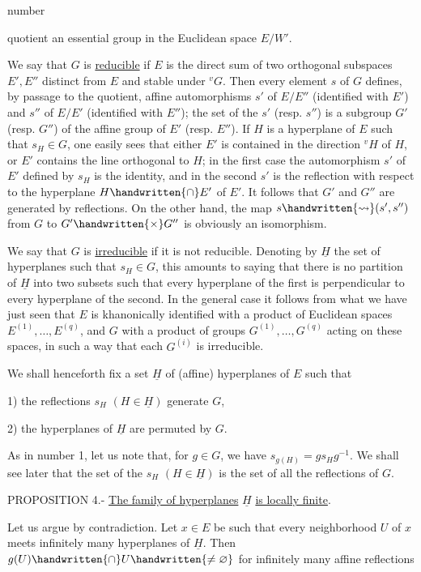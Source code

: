 \begin{flushright}number \end{flushright}
quotient an essential group in the Euclidean space $E/W'$.

We say that $G$ is \uline{reducible} if $E$ is the direct sum of two orthogonal subspaces $E',E''$ distinct from $E$ and stable under ${}^vG$. Then every element $s$ of $G$ defines, by passage to the quotient, affine automorphisms $s'$ of $E/E''$ (identified with $E'$) and $s''$ of $E/E'$ (identified with $E''$); the set of the $s'$ (resp. $s''$) is a subgroup $G'$ (resp. $G''$) of the affine group of $E'$ (resp. $E''$). If $H$ is a hyperplane of $E$ such that $s_H\in G$, one easily sees that either $E'$ is contained in the direction ${}^vH$ of $H$, or $E'$ contains the line orthogonal to $H$; in the first case the automorphism $s'$ of $E'$ defined by $s_H$ is the identity, and in the second $s'$ is the reflection with respect to the hyperplane $H\handwritten{\cap}E'$ of $E'$. It follows that $G'$ and $G''$ are generated by reflections. On the other hand, the map $s\handwritten{\rightsquigarrow}(s',s'')$ from $G$ to $G'\handwritten{\times}G''$ is obviously an isomorphism.

We say that $G$ is \uline{irreducible} if it is not reducible. Denoting by $\underline{H}$ the set of hyperplanes such that $s_H\in G$, this amounts to saying that there is no partition of $\underline{H}$ into two subsets such that every hyperplane of the first is perpendicular to every hyperplane of the second. In the general case it follows from what we have just seen that $E$ is khanonically identified with a product of Euclidean spaces $E^{(1)},\ldots,E^{(q)}$, and $G$ with a product of groups $G^{(1)},\ldots,G^{(q)}$ acting on these spaces, in such a way that each $G^{(i)}$ is irreducible.

We shall henceforth fix a set $\underline{H}$ of (affine) hyperplanes of $E$ such that

1) the reflections $s_H$ $(H\in\underline{H})$ generate $G$,

2) the hyperplanes of $\underline{H}$ are permuted by $G$.

As in number 1, let us note that, for $g\in G$, we have $s_{g(H)}=gs_Hg^{-1}$. We shall see later that the set of the $s_H$ $(H\in\underline{H})$ is the set of all the reflections of $G$.

PROPOSITION 4.- \uline{The family of hyperplanes} $\underline{H}$ \uline{is locally finite}.

Let us argue by contradiction. Let $x\in E$ be such that every neighborhood $U$ of $x$ meets infinitely many hyperplanes of $\underline{H}$. Then $g(U)\handwritten{\cap}U\handwritten{\ne\varnothing}$ for infinitely many affine reflections

